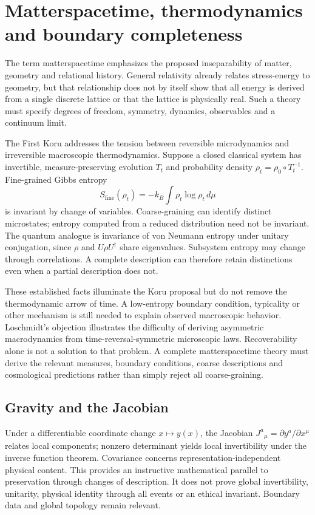 \documentclass[11pt,a4paper]{article}
\begin{document}
\section{Matterspacetime, thermodynamics and boundary completeness}
The term matterspacetime emphasizes the proposed inseparability of matter, geometry and relational history. General relativity already relates stress-energy to geometry, but that relationship does not by itself show that all energy is derived from a single discrete lattice or that the lattice is physically real. Such a theory must specify degrees of freedom, symmetry, dynamics, observables and a continuum limit.

The First Koru addresses the tension between reversible microdynamics and irreversible macroscopic thermodynamics. Suppose a closed classical system has invertible, measure-preserving evolution $T_t$ and probability density $\rho_t=\rho_0\circ T_t^{-1}$. Fine-grained Gibbs entropy
\[
S_{\mathrm{fine}}(\rho_t)=-k_B\int \rho_t\log\rho_t\,d\mu
\]
is invariant by change of variables. Coarse-graining can identify distinct microstates; entropy computed from a reduced distribution need not be invariant. The quantum analogue is invariance of von Neumann entropy under unitary conjugation, since $\rho$ and $U\rho U^\dagger$ share eigenvalues. Subsystem entropy may change through correlations. A complete description can therefore retain distinctions even when a partial description does not.

These established facts illuminate the Koru proposal but do not remove the thermodynamic arrow of time. A low-entropy boundary condition, typicality or other mechanism is still needed to explain observed macroscopic behavior. Loschmidt's objection illustrates the difficulty of deriving asymmetric macrodynamics from time-reversal-symmetric microscopic laws. Recoverability alone is not a solution to that problem. A complete matterspacetime theory must derive the relevant measures, boundary conditions, coarse descriptions and cosmological predictions rather than simply reject all coarse-graining.

\subsection{Gravity and the Jacobian}
Under a differentiable coordinate change $x\mapsto y(x)$, the Jacobian $J^a{}_\mu=\partial y^a/\partial x^\mu$ relates local components; nonzero determinant yields local invertibility under the inverse function theorem. Covariance concerns representation-independent physical content. This provides an instructive mathematical parallel to preservation through changes of description. It does not prove global invertibility, unitarity, physical identity through all events or an ethical invariant. Boundary data and global topology remain relevant.
\end{document}
